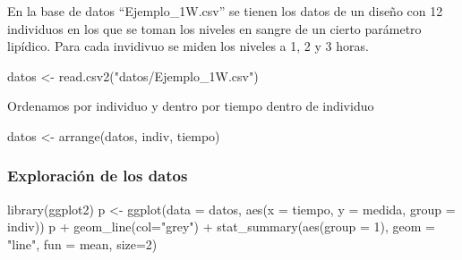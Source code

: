 \documentclass[
]{book}
\newenvironment{Shaded}{\begin{snugshade}}{\end{snugshade}}
\newcommand{\AttributeTok}[1]{\textcolor[rgb]{0.77,0.63,0.00}{#1}}
\newcommand{\DecValTok}[1]{\textcolor[rgb]{0.00,0.00,0.81}{#1}}
\newcommand{\FunctionTok}[1]{\textcolor[rgb]{0.00,0.00,0.00}{#1}}
\newcommand{\NormalTok}[1]{#1}
\newcommand{\OtherTok}[1]{\textcolor[rgb]{0.56,0.35,0.01}{#1}}
\newcommand{\SpecialCharTok}[1]{\textcolor[rgb]{0.00,0.00,0.00}{#1}}
\newcommand{\StringTok}[1]{\textcolor[rgb]{0.31,0.60,0.02}{#1}}
\begin{document}
En la base de datos ``Ejemplo\_1W.csv'' se tienen los datos de un diseño con 12 individuos en los que se toman los niveles en sangre de un cierto parámetro lipídico. Para cada invidivuo se miden los niveles a 1, 2 y 3 horas.

\begin{Shaded}
\begin{Highlighting}[]
\NormalTok{datos }\OtherTok{\textless{}{-}} \FunctionTok{read.csv2}\NormalTok{(}\StringTok{"datos/Ejemplo\_1W.csv"}\NormalTok{)}
\end{Highlighting}
\end{Shaded}

Ordenamos por individuo y dentro por tiempo dentro de individuo

\begin{Shaded}
\begin{Highlighting}[]
\NormalTok{datos }\OtherTok{\textless{}{-}} \FunctionTok{arrange}\NormalTok{(datos, indiv, tiempo)}
\end{Highlighting}
\end{Shaded}

\hypertarget{exploraciuxf3n-de-los-datos}{%
\subsubsection{Exploración de los datos}\label{exploraciuxf3n-de-los-datos}}

\begin{Shaded}
\begin{Highlighting}[]
\FunctionTok{library}\NormalTok{(ggplot2)}
\NormalTok{p }\OtherTok{\textless{}{-}} \FunctionTok{ggplot}\NormalTok{(}\AttributeTok{data =}\NormalTok{ datos, }\FunctionTok{aes}\NormalTok{(}\AttributeTok{x =}\NormalTok{ tiempo, }\AttributeTok{y =}\NormalTok{ medida, }\AttributeTok{group =}\NormalTok{ indiv))}
\NormalTok{p }\SpecialCharTok{+} \FunctionTok{geom\_line}\NormalTok{(}\AttributeTok{col=}\StringTok{"grey"}\NormalTok{) }\SpecialCharTok{+} \FunctionTok{stat\_summary}\NormalTok{(}\FunctionTok{aes}\NormalTok{(}\AttributeTok{group =} \DecValTok{1}\NormalTok{),}
    \AttributeTok{geom =} \StringTok{"line"}\NormalTok{, }\AttributeTok{fun =}\NormalTok{ mean, }\AttributeTok{size=}\DecValTok{2}\NormalTok{)}
\end{Highlighting}
\end{Shaded}
\end{document}
